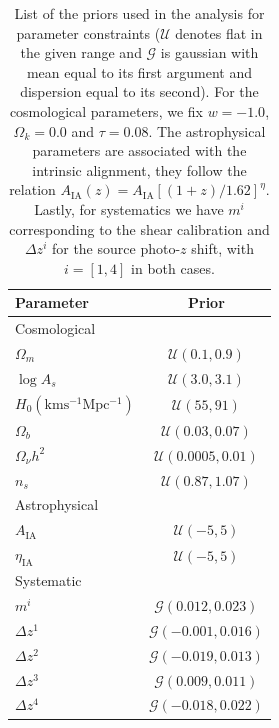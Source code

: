 \documentclass[twocolumn,nofootinbib]{\docclass}
\begin{document}
	\begin{table}
	\centering
	\begin{tabular} { l c} 
		\hline
		\hline
		Parameter		& Prior	\\ \hline
		Cosmological    & \\ [1ex]
		$\Omega_m$      & $\mathcal{U}(0.1, 0.9)$ \\
		$\log A_s$      & $\mathcal{U}(3.0, 3.1)$ \\
		$H_0 \mathrm{(km s^{-1} Mpc^{-1})}$	& $\mathcal{U}(55, 91)$\\
		$\Omega_b$      & $\mathcal{U}(0.03, 0.07)$ \\
		$\Omega_\nu h^2$& $\mathcal{U}(0.0005, 0.01)$ \\
		$n_s$           & $\mathcal{U}(0.87, 1.07)$ \\ [1ex]
		\hline
		Astrophysical       & \\ [1ex]
		$A_{\mathrm{IA}}$	& $\mathcal{U}(-5, 5)$ \\
		$\eta_{\mathrm{IA}}$& $\mathcal{U}(-5, 5)$ \\ [1ex]
		\hline
		Systematic      & \\ [1ex]
		$m^i$			& $\mathcal{G}(0.012, 0.023)$ \\
		$\Delta z^1$	& $\mathcal{G}(-0.001, 0.016)$ \\
		$\Delta z^2$	& $\mathcal{G}(-0.019, 0.013)$ \\
		$\Delta z^3$	& $\mathcal{G}(0.009, 0.011)$ \\
		$\Delta z^4$	& $\mathcal{G}(-0.018, 0.022)$ \\ [1ex]
		\hline
		\hline
	\end{tabular}
	\caption{List of the priors used in the analysis for parameter constraints ($\mathcal{U}$ denotes flat in the given range and $\mathcal{G}$ is gaussian with mean equal to its first argument and dispersion equal to its second). For the cosmological parameters, we fix $w = -1.0$, $\Omega_k =  0.0$ and $\tau =  0.08$. The astrophysical parameters are associated with the intrinsic alignment, they follow the relation $A_{\mathrm{IA}}(z) = A_{\mathrm{IA}}[(1+z)/1.62]^{\eta}$. Lastly, for systematics we have $m^i$ corresponding to the shear calibration and  $\Delta z^i$ for the source photo-$z$ shift, with $i = [1, 4]$ in both cases.}
	\label{tab:priors}
	\end{table}
	
\end{document}
